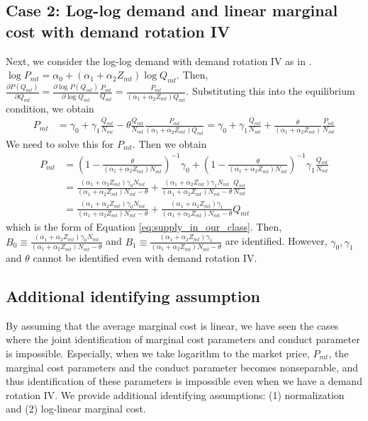 \documentclass[11pt]{article}
\begin{document}
\subsection{Case 2: Log-log demand and linear marginal cost with demand rotation IV}
Next, we consider the log-log demand with demand rotation IV as in \cite{bresnahan1982oligopoly}.
$\log P_{mt}=\alpha_0+(\alpha_1+\alpha_2 Z_{mt}) \log Q_{mt}$. Then, $\frac{\partial P\left(Q_{m t}\right)}{\partial Q_{mt}}=\frac{\partial \log P\left(Q_{m t}\right)}{\partial \log Q_{mt}}\frac{P_{mt}}{Q_{mt}}=\frac{P_{mt}}{(\alpha_1+\alpha_2 Z_{mt}) Q_{mt}}$. Substituting this into the equilibrium condition, we obtain
    \begin{align}
        P_{m t}&=\gamma_0+\gamma_1 \frac{Q_{mt}}{N_{mt}}-\theta \frac{Q_{mt}}{N_{mt}}\frac{P_{mt}}{(\alpha_1+\alpha_2 Z_{mt}) Q_{mt}}=\gamma_0+\gamma_1 \frac{Q_{mt}}{N_{mt}}+ \frac{\theta}{(\alpha_1+\alpha_2 Z_{mt})}\frac{P_{mt}}{N_{mt}}
    \end{align}
    We need to solve this for $P_{mt}$. Then we obtain
    \begin{align*}
        P_{m t}&=\left(1-\frac{\theta}{(\alpha_1+\alpha_2 Z_{mt}) N_{mt}}\right)^{-1}\gamma_0+\left(1-\frac{\theta}{(\alpha_1+\alpha_2 Z_{mt}) N_{mt}}\right)^{-1}\gamma_1 \frac{Q_{mt}}{N_{mt}}\\
        & =\frac{(\alpha_1+\alpha_2 Z_{mt}) \gamma_0 N_{mt}}{(\alpha_1+\alpha_2 Z_{mt}) N_{mt}-\theta}+\frac{(\alpha_1+\alpha_2 Z_{mt}) \gamma_1 N_{mt}}{(\alpha_1+\alpha_2 Z_{mt}) N_{mt}-\theta} \frac{Q_{mt}}{N_{mt}}\\
        &=\frac{(\alpha_1+\alpha_2 Z_{mt}) \gamma_0 N_{mt}}{(\alpha_1+\alpha_2 Z_{mt}) N_{mt}-\theta}+\frac{(\alpha_1+\alpha_2 Z_{mt}) \gamma_1}{(\alpha_1+\alpha_2 Z_{mt}) N_{mt}-\theta} Q_{mt}
    \end{align*}
    which is the form of Equation \eqref{eq:supply_in_our_class}.
    Then, $B_0 \equiv \frac{(\alpha_1+\alpha_2 Z_{mt}) \gamma_0 N_{mt}}{(\alpha_1+\alpha_2 Z_{mt}) N_{mt}-\theta}$ and $B_1\equiv\frac{(\alpha_1+\alpha_2 Z_{mt}) \gamma_1}{(\alpha_1+\alpha_2 Z_{mt}) N_{mt}-\theta}$ are identified. However, $\gamma_0,\gamma_1$ and $\theta$ cannot be identified even with demand rotation IV.



\subsection{Additional identifying assumption}

By assuming that the average marginal cost is linear, we have seen the cases where the joint identification of marginal cost parameters and conduct parameter is impossible.
Especially, when we take logarithm to the market price, $P_{mt}$, the marginal cost parameters and the conduct parameter becomes nonseparable, and thus identification of these parameters is impossible even when we have a demand rotation IV. We provide additional identifying assumptions: (1) normalization and (2) log-linear marginal cost.
\end{document}
